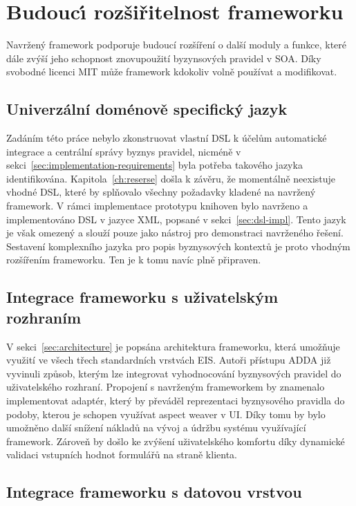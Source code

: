 \section{Budouc\'{\i} rozšiřitelnost frameworku}

Navržený framework podporuje budoucí rozšíření o další moduly a funkce, které
dále zvýší jeho schopnost znovupoužití byzynsových pravidel v \gls{SOA}.
Díky svobodné licenci \gls{MIT} může framework kdokoliv volně používat a modifikovat.

\subsection{Univerzální doménově specifický jazyk}
Zadáním této práce nebylo zkonstruovat vlastní \gls{DSL}
k účelům automatické integrace a centrální správy byznys pravidel,
nicméně v sekci~\ref{sec:implementation-requirements} byla potřeba takového
jazyka identifikována. Kapitola~\ref{ch:reserse}
došla k závěru, že momentálně neexistuje vhodné \gls{DSL},
které by splňovalo všechny požadavky kladené na navržený framework.
V rámci implementace prototypu knihoven
bylo navrženo a implementováno \gls{DSL} v jazyce \gls{XML},
popsané v sekci~\ref{sec:dsl-impl}. Tento jazyk je však
omezený a slouží pouze jako nástroj pro demonstraci navrženého řešení.
Sestavení komplexního jazyka pro popis byznysových kontextů je proto vhodným
rozšířením frameworku. Ten je k tomu navíc plně připraven.

\subsection{Integrace frameworku s uživatelským rozhraním}

V sekci~\ref{sec:architecture} je popsána architektura frameworku, která umožňuje využití
ve všech třech standardních vrstvách \gls{EIS}. Autoři přístupu \gls{ADDA} již
vyvinuli způsob, kterým lze integrovat vyhodnocování byznysových pravidel do uživatelského
rozhraní. Propojení s navrženým frameworkem by znamenalo implementovat adaptér, který by převáděl
reprezentaci byznysového pravidla do podoby, kterou je schopen využívat aspect weaver v \gls{UI}.
Díky tomu by bylo umožněno další snížení nákladů na vývoj a údržbu systému využívající framework.
Zároveň by došlo ke zvýšení uživatelského komfortu díky dynamické validaci vstupních hodnot formulářů
na straně klienta.

\subsection{Integrace frameworku s datovou vrstvou}


